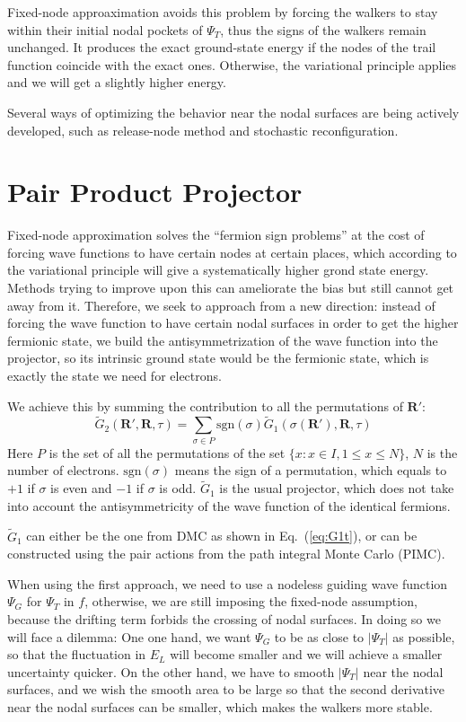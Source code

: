 \documentclass[aps,prl,reprint,groupedaddress]{revtex4-1}
\begin{document}
Fixed-node approaximation avoids this problem by forcing the walkers to stay within their initial nodal pockets of $\Psi_T$, thus the signs of the walkers remain unchanged.
It produces the exact ground-state energy if the nodes of the trail function coincide with the exact ones.
Otherwise, the variational principle applies and we will get a slightly higher energy.

Several ways of optimizing the behavior near the nodal surfaces are being actively developed, such as release-node method and stochastic reconfiguration.

\section{Pair Product Projector}

Fixed-node approximation solves the ``fermion sign problems'' at the cost of forcing wave functions to have certain nodes at certain places, which according to the variational principle will give a systematically higher grond state energy.
Methods trying to improve upon this can ameliorate the bias but still cannot get away from it.
Therefore, we seek to approach from a new direction: instead of forcing the wave function to have certain nodal surfaces in order to get the higher fermionic state, we build the antisymmetrization of the wave function into the projector, so its intrinsic ground state would be the fermionic state, which is exactly the state we need for electrons.

We achieve this by summing the contribution to all the permutations of $\bm{R'}$:
\begin{equation}
\label{eq:ppp}
\widetilde{G}_2(\bm{R'}, \bm{R},\tau)
= \sum\limits_{\sigma\in P} \mathrm{sgn}(\sigma) \widetilde{G}_1(\sigma(\bm{R'}), \bm{R}, \tau)
\end{equation}
Here $P$ is the set of all the permutations of the set $\{x:x \in I, 1 \leq x \leq N\}$, $N$ is the number of electrons.
$\mathrm{sgn}(\sigma)$ means the sign of a permutation, which equals to $+1$ if $\sigma$ is even and $-1$ if $\sigma$ is odd.
$\widetilde{G}_1$ is the usual projector, which does not take into account the antisymmetricity of the wave function of the identical fermions.

$\widetilde{G}_1$ can either be the one from DMC as shown in Eq.~(\ref{eq:G1t}), or can be constructed using the pair actions from the path integral Monte Carlo (PIMC).

When using the first approach, we need to use a nodeless guiding wave function $\Psi_G$ for $\Psi_T$ in $f$, otherwise, we are still imposing the fixed-node assumption, because the drifting term forbids the crossing of nodal surfaces.
In doing so we will face a dilemma:
One one hand, we want $\Psi_G$ to be as close to $|\Psi_T|$ as possible, so that the fluctuation in $E_L$ will become smaller and we will achieve a smaller uncertainty quicker.
On the other hand, we have to smooth $|\Psi_T|$ near the nodal surfaces, and we wish the smooth area to be large so that the second derivative near the nodal surfaces can be smaller, which makes the walkers more stable.
\end{document}
